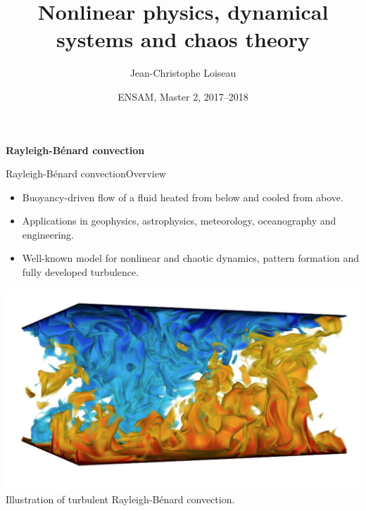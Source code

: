 \documentclass[usenames,dvipsnames,svgnames,10pt,aspectratio=169]{beamer}
\title[Nonlinear Physics] %
{
	Nonlinear physics, dynamical \\ systems and chaos theory
}
\author[J.-Ch.~Loiseau] %
{
	Jean-Christophe Loiseau
}
\institute[unused]
{
	\url{jean-christophe.loiseau@ensam.eu} \\
	DynFluid, \\
	Arts et M\'etiers ParisTech, France
}
\date[unused]{ENSAM, Master 2, 2017--2018}
\begin{document}
\titleframe %


\begin{frame}[t, c]{}
	\centering
	\vspace{1cm}

	{\Large \textbf{Rayleigh-Bénard convection}}

	\bigskip

	{}

\end{frame}

\begin{frame}[t, c]{Rayleigh-Bénard convection}{Overview}
	\begin{minipage}{.48\textwidth}
		\begin{itemize}
			\item Buoyancy-driven flow of a fluid heated from below and cooled from above.

			\medskip

			\item Applications in geophysics, astrophysics, meteorology, oceanography and engineering.

			\medskip

			\item Well-known model for nonlinear and chaotic dynamics, pattern formation and fully developed turbulence.
		\end{itemize}
	\end{minipage}%
	\hfill
	\begin{minipage}{.48\textwidth}
		\centering
		\includegraphics[width=.95\textwidth]{turbulent_rayleigh_benard} \\

		{\small Illustration of turbulent Rayleigh-Bénard convection.}
	\end{minipage}

	\vspace{1cm}
\end{frame}
\end{document}
